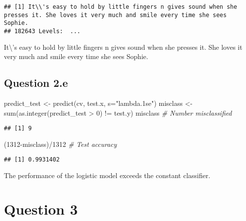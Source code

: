 \documentclass[
]{article}
\newenvironment{Shaded}{\begin{snugshade}}{\end{snugshade}}
\newcommand{\AttributeTok}[1]{\textcolor[rgb]{0.77,0.63,0.00}{#1}}
\newcommand{\CommentTok}[1]{\textcolor[rgb]{0.56,0.35,0.01}{\textit{#1}}}
\newcommand{\DecValTok}[1]{\textcolor[rgb]{0.00,0.00,0.81}{#1}}
\newcommand{\FunctionTok}[1]{\textcolor[rgb]{0.00,0.00,0.00}{#1}}
\newcommand{\NormalTok}[1]{#1}
\newcommand{\OtherTok}[1]{\textcolor[rgb]{0.56,0.35,0.01}{#1}}
\newcommand{\SpecialCharTok}[1]{\textcolor[rgb]{0.00,0.00,0.00}{#1}}
\newcommand{\StringTok}[1]{\textcolor[rgb]{0.31,0.60,0.02}{#1}}
\begin{document}
\begin{verbatim}
## [1] It\\'s easy to hold by little fingers n gives sound when she presses it. She loves it very much and smile every time she sees Sophie.
## 182643 Levels:  ...
\end{verbatim}

It\textbackslash's easy to hold by little fingers n gives sound when she
presses it. She loves it very much and smile every time she sees Sophie.

\hypertarget{question-2.e}{%
\subsection{Question 2.e}\label{question-2.e}}

\begin{Shaded}
\begin{Highlighting}[]
\NormalTok{predict\_test }\OtherTok{\textless{}{-}} \FunctionTok{predict}\NormalTok{(cv, test.x, }\AttributeTok{s=}\StringTok{"lambda.1se"}\NormalTok{)}
\NormalTok{misclass }\OtherTok{\textless{}{-}} \FunctionTok{sum}\NormalTok{(}\FunctionTok{as.integer}\NormalTok{(predict\_test }\SpecialCharTok{\textgreater{}} \DecValTok{0}\NormalTok{) }\SpecialCharTok{!=}\NormalTok{ test.y)}
\NormalTok{misclass }\CommentTok{\# Number misclassified}
\end{Highlighting}
\end{Shaded}

\begin{verbatim}
## [1] 9
\end{verbatim}

\begin{Shaded}
\begin{Highlighting}[]
\NormalTok{(}\DecValTok{1312}\SpecialCharTok{{-}}\NormalTok{misclass)}\SpecialCharTok{/}\DecValTok{1312} \CommentTok{\# Test accuracy}
\end{Highlighting}
\end{Shaded}

\begin{verbatim}
## [1] 0.9931402
\end{verbatim}

The performance of the logistic model exceeds the constant classifier.

\hypertarget{question-3}{%
\section{Question 3}\label{question-3}}
\end{document}

